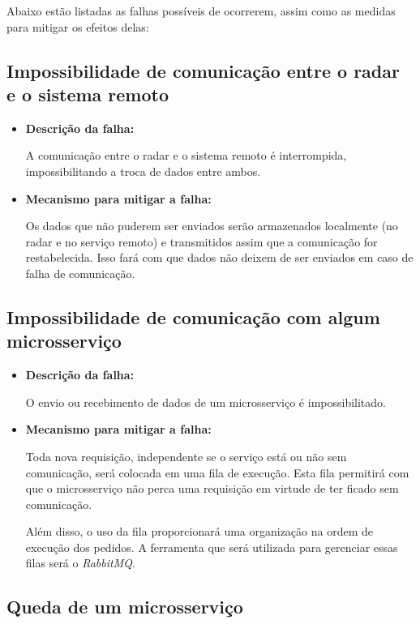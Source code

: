 Abaixo estão listadas as falhas possíveis de ocorrerem, assim como as medidas para mitigar os efeitos delas:

\subsection{Impossibilidade de comunicação entre o radar e o sistema remoto}

\begin{itemize}
    \item \textbf{Descrição da falha:}

    A comunicação entre o radar e o sistema remoto é interrompida, impossibilitando a troca de dados entre ambos.

    \item \textbf{Mecanismo para mitigar a falha:}

    Os dados que não puderem ser enviados serão armazenados localmente (no radar e no serviço remoto) e transmitidos assim que a comunicação for restabelecida. Isso fará com que dados não deixem de ser enviados em caso de falha de comunicação.
\end{itemize}

\subsection{Impossibilidade de comunicação com algum microsserviço}

\begin{itemize}
    \item \textbf{Descrição da falha:}

     O envio ou recebimento de dados de um microsserviço é impossibilitado.

    \item \textbf{Mecanismo para mitigar a falha:}

    Toda nova requisição, independente se o serviço está ou não sem comunicação, será colocada em uma fila de execução. Esta fila permitirá com que o microsserviço não perca uma requisição em virtude de ter ficado sem comunicação.

    Além disso, o uso da fila proporcionará uma organização na ordem de execução dos pedidos. A ferramenta que será utilizada para gerenciar essas filas será o \textit{RabbitMQ}.
\end{itemize}

\subsection{Queda de um microsserviço}

